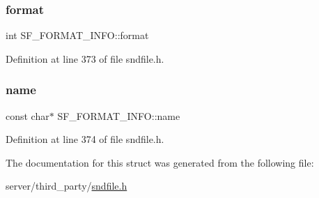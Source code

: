 \mbox{\label{struct_s_f___f_o_r_m_a_t___i_n_f_o_a8d07503c07b5330c298341ca03859f66}} 
\subsubsection{\texorpdfstring{format}{format}}
{\footnotesize\ttfamily int S\+F\+\_\+\+F\+O\+R\+M\+A\+T\+\_\+\+I\+N\+F\+O\+::format}



Definition at line 373 of file sndfile.\+h.

\mbox{\label{struct_s_f___f_o_r_m_a_t___i_n_f_o_a23129f58c26e7ce815049154d27fb408}} 
\subsubsection{\texorpdfstring{name}{name}}
{\footnotesize\ttfamily const char$\ast$ S\+F\+\_\+\+F\+O\+R\+M\+A\+T\+\_\+\+I\+N\+F\+O\+::name}



Definition at line 374 of file sndfile.\+h.



The documentation for this struct was generated from the following file\+:\begin{DoxyCompactItemize}
\item 
server/third\+\_\+party/\mbox{\hyperlink{sndfile_8h}{sndfile.\+h}}\end{DoxyCompactItemize}
